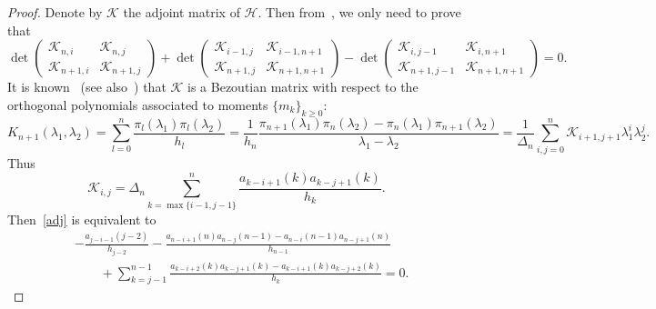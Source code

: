 \documentclass[a4paper]{article}
\theoremstyle{plain}
\theoremstyle{definition}
\newcommand{\nn}{\nonumber}
\begin{document}
\begin{proof}
	Denote by $\mathcal K$ the adjoint matrix of $\mathcal H$. Then from~\cite[Section 1.4]{Matrix}, we only need to prove that
	\begin{equation} \label{adj}
		\det\begin{pmatrix}
			\mathcal K_{n,i}&\mathcal K_{n,j}\\\mathcal K_{n+1,i}&\mathcal K_{n+1,j}
		\end{pmatrix}+\det\begin{pmatrix}
			\mathcal K_{i-1,j}&\mathcal K_{i-1,n+1}\\\mathcal K_{n+1,j}&\mathcal K_{n+1,n+1}
		\end{pmatrix}-\det\begin{pmatrix}
			\mathcal K_{i,j-1}&\mathcal K_{i,n+1}\\\mathcal K_{n+1,j-1}&\mathcal K_{n+1,n+1}
		\end{pmatrix}=0.
	\end{equation} 
	It is known~\cite{Bezoutian} (see also~\cite{Hankel}) that $\mathcal K$ is a Bezoutian matrix with respect to the orthogonal polynomials associated to moments $\{m_k\}_{k\ge0}$:
	\begin{equation}
		K_{n+1}(\lambda_1,\lambda_2)=\sum_{l=0}^{n}\frac{\pi_l(\lambda_1)\pi_l(\lambda_2)}{h_l}=\frac{1}{h_{n}}\frac{\pi_{n+1}(\lambda_1)\pi_n(\lambda_2)-\pi_n(\lambda_1)\pi_{n+1}(\lambda_2)}{\lambda_1-\lambda_2}=\frac{1}{\Delta_n}\sum_{i,j=0}^{n}\mathcal K_{i+1,j+1}\lambda_1^i\lambda_2^j.
	\end{equation} Thus
	\begin{equation}
		\mathcal K_{i,j}=\Delta_n\sum_{k=\max\{i-1,j-1\}}^n\frac{a_{k-i+1}(k)a_{k-j+1}(k)}{h_k}.
	\end{equation} 
	Then~\eqref{adj} is equivalent to
	\begin{align}
		&-\frac{a_{j-i-1}(j-2)}{h_{j-2}}-\frac{a_{n-i+1}(n)a_{n-j}(n-1)-a_{n-i}(n-1)a_{n-j+1}(n)}{h_{n-1}}\nn\\
		&\qquad+\sum_{k=j-1}^{n-1}\frac{a_{k-i+2}(k)a_{k-j+1}(k)-a_{k-i+1}(k)a_{k-j+2}(k)}{h_k}=0. \label{adj1}
	\end{align}
	

\end{proof}
\end{document}
